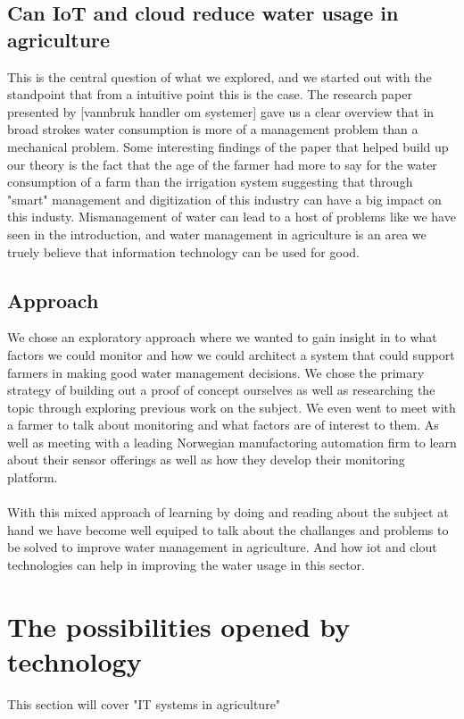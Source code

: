 \documentclass[]{uiophd}
\begin{document}
\subsection{Can IoT and cloud reduce water usage in agriculture}
This is the central question of what we explored, and we started out with the standpoint that from a intuitive point this is the case. The research paper presented by [vannbruk handler om systemer] gave us a clear overview that in broad strokes water consumption is more of a management problem than a mechanical problem. Some interesting findings of the paper that helped build up our theory is the fact that the age of the farmer had more to say for the water consumption of a farm than the irrigation system suggesting that through "smart" management and digitization of this industry can have a big impact on this industy. Mismanagement of water can lead to a host of problems like we have seen in the introduction, and water management in agriculture is an area we truely believe that information technology can be used for good.

\subsection{Approach}
We chose an exploratory approach where we wanted to gain insight in to what factors we could monitor and how we could architect a system that could support farmers in making good water management decisions. We chose the primary strategy of building out a proof of concept ourselves as well as researching the topic through exploring previous work on the subject. We even went to meet with a farmer to talk about monitoring and what factors are of interest to them. As well as meeting with a leading Norwegian manufactoring automation firm to learn about their sensor offerings as well as how they develop their monitoring platform.
\\\\
With this mixed approach of learning by doing and reading about the subject at hand we have become well equiped to talk about the challanges and problems to be solved to improve water management in agriculture. And how iot and clout technologies can help in improving the water usage in this sector.

\section{The possibilities opened by technology}
This section will cover "IT systems in agriculture"
\end{document}
